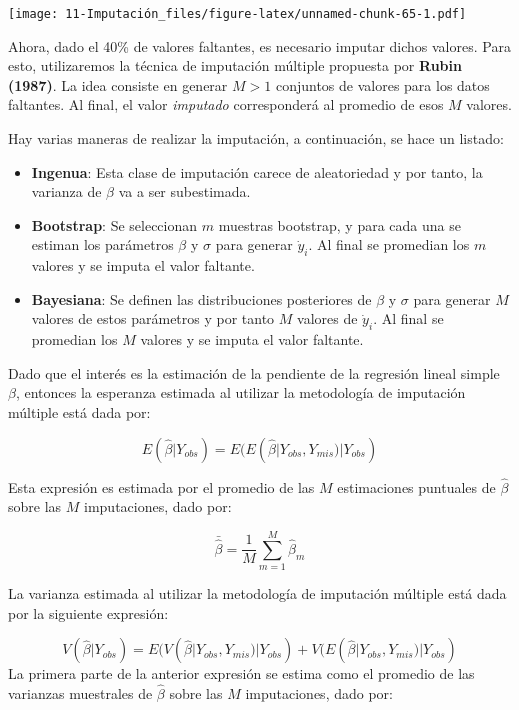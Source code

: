\documentclass[
  12pt,
]{book}
\begin{document}
\texttt{[image: 11-Imputación\_files/figure-latex/unnamed-chunk-65-1.pdf]}

Ahora, dado el 40\% de valores faltantes, es necesario imputar dichos valores. Para esto, utilizaremos la técnica de imputación múltiple propuesta por \textbf{Rubin (1987)}. La idea consiste en generar \(M > 1\) conjuntos de valores
para los datos faltantes. Al final, el valor \emph{imputado} corresponderá al
promedio de esos \(M\) valores.

Hay varias maneras de realizar la imputación, a continuación, se hace un listado:

\begin{itemize}
\item
  \textbf{Ingenua}: Esta clase de imputación carece de aleatoriedad y por tanto, la
  varianza de \(\beta\) va a ser subestimada.
\item
  \textbf{Bootstrap}: Se seleccionan \(m\) muestras bootstrap, y para cada una se
  estiman los parámetros \(\beta\) y \(\sigma\) para generar \(\dot{y}_i\). Al final
  se promedian los \(m\) valores y se imputa el valor faltante.
\item
  \textbf{Bayesiana}: Se definen las distribuciones posteriores de \(\beta\) y
  \(\sigma\) para generar \(M\) valores de estos parámetros y por tanto \(M\)
  valores de \(\dot{y}_i\). Al final se promedian los \(M\) valores y se imputa el
  valor faltante.
\end{itemize}

Dado que el interés es la estimación de la pendiente de la regresión lineal simple
\(\beta\), entonces la esperanza estimada al utilizar la metodología de imputación
múltiple está dada por:

\[E(\hat{\beta} | Y_{obs}) = E(E(\hat{\beta} | Y_{obs}, Y_{mis}) | Y_{obs})\]

Esta expresión es estimada por el promedio de las \(M\) estimaciones puntuales de
\(\hat{\beta}\) sobre las \(M\) imputaciones, dado por:

\[\bar{\hat{\beta}} = \frac{1}{M} \sum_{m = 1} ^ M \hat{\beta}_m\]

La varianza estimada al utilizar la metodología de imputación múltiple está dada
por la siguiente expresión:

\[
V(\hat{\beta} | Y_{obs}) = E(V(\hat{\beta} | Y_{obs}, Y_{mis}) | Y_{obs}) +
V(E(\hat{\beta} | Y_{obs}, Y_{mis}) | Y_{obs}) 
\]
La primera parte de la anterior expresión se estima como el promedio de las
varianzas muestrales de \(\hat{\beta}\) sobre las \(M\) imputaciones, dado por:
\end{document}
